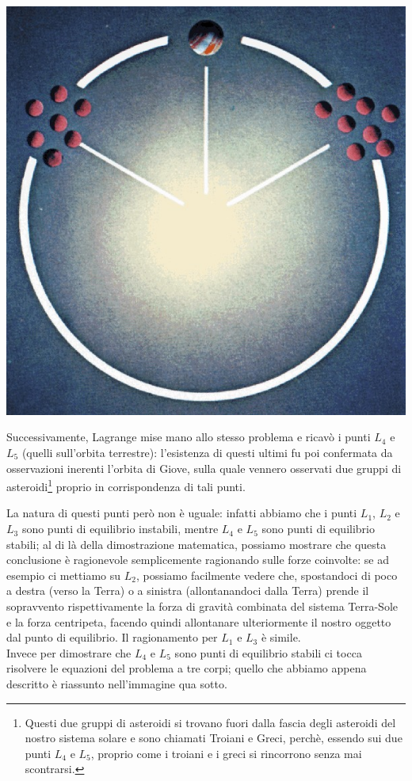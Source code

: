 \begin{minipage}{.35\textwidth}
	\centering
	\includegraphics[width=1\textwidth]{Img/pti_lagrangiani_giove.jpg}
\end{minipage}
\begin{minipage}{.65\textwidth}
Successivamente, Lagrange mise mano allo stesso problema e ricavò i punti $L_4$ e $L_5$ (quelli sull'orbita terrestre): l'esistenza di questi ultimi fu poi confermata da osservazioni inerenti l'orbita di Giove, sulla quale vennero osservati due gruppi di asteroidi\footnote{Questi due gruppi di asteroidi si trovano fuori dalla fascia degli asteroidi del nostro sistema solare e sono chiamati Troiani e Greci, perchè, essendo sui due punti $L_4$ e $L_5$, proprio come i troiani e i greci si rincorrono senza mai scontrarsi.} proprio in corrispondenza di tali punti.
\end{minipage}
\vspace{0.05cm}

La natura di questi punti però non è uguale: infatti abbiamo che i punti $L_1$, $L_2$ e $L_3$ sono punti di equilibrio instabili, mentre $L_4$ e $L_5$ sono punti di equilibrio stabili; al di là della dimostrazione matematica, possiamo mostrare che questa conclusione è ragionevole semplicemente ragionando sulle forze coinvolte: se ad esempio ci mettiamo su $L_2$, possiamo facilmente vedere che, spostandoci di poco a destra (verso la Terra) o a sinistra (allontanandoci dalla Terra) prende il sopravvento rispettivamente la forza di gravità combinata del sistema Terra-Sole e la forza centripeta, facendo quindi allontanare ulteriormente il nostro oggetto dal punto di equilibrio. Il ragionamento per $L_1$ e $L_3$ è simile.\\
Invece per dimostrare che $L_4$ e $L_5$ sono punti di equilibrio stabili ci tocca risolvere le equazioni del problema a tre corpi; quello che abbiamo appena descritto è riassunto nell'immagine qua sotto.

